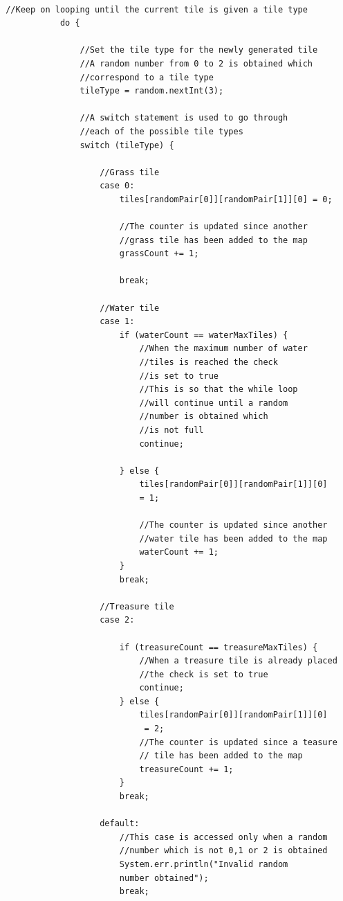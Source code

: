 \documentclass[a4paper,12pt]{extarticle}
\begin{document}
\newpage
\begin{lstlisting}

 //Keep on looping until the current tile is given a tile type
            do {

                //Set the tile type for the newly generated tile
                //A random number from 0 to 2 is obtained which 
                //correspond to a tile type
                tileType = random.nextInt(3);

                //A switch statement is used to go through
                //each of the possible tile types
                switch (tileType) {

                    //Grass tile
                    case 0:
                        tiles[randomPair[0]][randomPair[1]][0] = 0;

                        //The counter is updated since another 
                        //grass tile has been added to the map
                        grassCount += 1;

                        break;

                    //Water tile
                    case 1:
                        if (waterCount == waterMaxTiles) {
                            //When the maximum number of water 
                            //tiles is reached the check 
                            //is set to true
                            //This is so that the while loop 
                            //will continue until a random 
                            //number is obtained which
                            //is not full
                            continue;

                        } else {
                            tiles[randomPair[0]][randomPair[1]][0] 
                            = 1;

                            //The counter is updated since another 
                            //water tile has been added to the map
                            waterCount += 1;
                        }
                        break;

                    //Treasure tile
                    case 2:

                        if (treasureCount == treasureMaxTiles) {
                            //When a treasure tile is already placed 
                            //the check is set to true
                            continue;
                        } else {
                            tiles[randomPair[0]][randomPair[1]][0]
                             = 2;
                            //The counter is updated since a teasure
                            // tile has been added to the map
                            treasureCount += 1;
                        }
                        break;

                    default:
                        //This case is accessed only when a random 
                        //number which is not 0,1 or 2 is obtained
                        System.err.println("Invalid random 
                        number obtained");
                        break;
                
\end{lstlisting}
\end{document}
